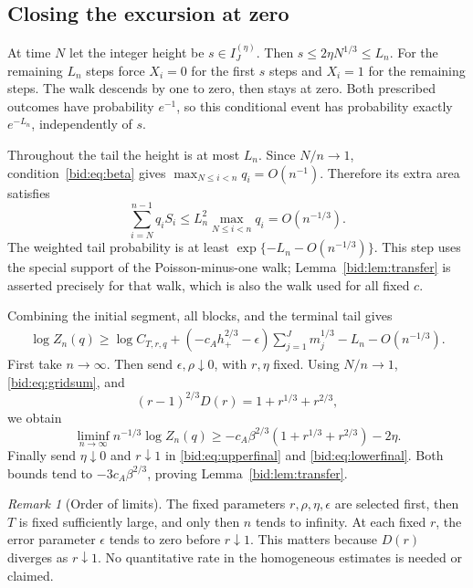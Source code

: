 \documentclass[11pt,letterpaper]{article}
\numberwithin{equation}{section}
\theoremstyle{remark}\newtheorem{remark}[theorem]{Remark}
\begin{document}
\subsection{Closing the excursion at zero}
At time $N$ let the integer height be
$s\in I_J^{(\eta)}$. Then
$s\leq2\eta N^{1/3}\leq L_n$. For the remaining $L_n$ steps force
$X_i=0$ for the first $s$ steps and $X_i=1$ for the remaining steps.
The walk descends by one to zero, then stays at zero. Both prescribed
outcomes have probability $e^{-1}$, so this conditional event has
probability exactly $e^{-L_n}$, independently of $s$.

Throughout the tail the height is at most $L_n$. Since $N/n\to1$,
condition~\eqref{bid:eq:beta} gives
$\max_{N\leq i<n}q_i=O(n^{-1})$. Therefore its extra area satisfies
\begin{equation}\label{bid:eq:tailarea}
 \sum_{i=N}^{n-1}q_iS_i
 \leq L_n^2\max_{N\leq i<n}q_i=O(n^{-1/3}).
\end{equation}
The weighted tail probability is at least
$\exp\{-L_n-O(n^{-1/3})\}$. This step uses the special support of the
Poisson-minus-one walk; Lemma~\ref{bid:lem:transfer} is asserted precisely
for that walk, which is also the walk used for all fixed $c$.

Combining the initial segment, all blocks, and the terminal tail gives
\begin{align}
 \log Z_n(q)\geq\log C_{T,r,q}
   +(-c_Ah_+^{2/3}-\epsilon)\sum_{j=1}^Jm_j^{1/3}
   -L_n-O(n^{-1/3}).\label{bid:eq:lowerproduct}
\end{align}
First take $n\to\infty$. Then send $\epsilon,\rho\downarrow0$, with
$r,\eta$ fixed. Using $N/n\to1$, \eqref{bid:eq:gridsum}, and
\begin{equation}\label{bid:eq:lowerconstant}
 (r-1)^{2/3}D(r)=1+r^{1/3}+r^{2/3},
\end{equation}
we obtain
\begin{equation}\label{bid:eq:lowerfinal}
 \liminf_{n\to\infty}n^{-1/3}\log Z_n(q)
 \geq-c_A\beta^{2/3}(1+r^{1/3}+r^{2/3})-2\eta.
\end{equation}
Finally send $\eta\downarrow0$ and $r\downarrow1$ in
\eqref{bid:eq:upperfinal} and \eqref{bid:eq:lowerfinal}. Both bounds tend to
$-3c_A\beta^{2/3}$, proving Lemma~\ref{bid:lem:transfer}.

\begin{remark}[Order of limits]
The fixed parameters $r,\rho,\eta,\epsilon$ are selected first, then
$T$ is fixed sufficiently large, and only then $n$ tends to infinity.
At each fixed $r$, the error parameter $\epsilon$ tends to zero before
$r\downarrow1$. This matters because $D(r)$ diverges as $r\downarrow1$.
No quantitative rate in the homogeneous estimates is needed or claimed.
\end{remark}
\end{document}
